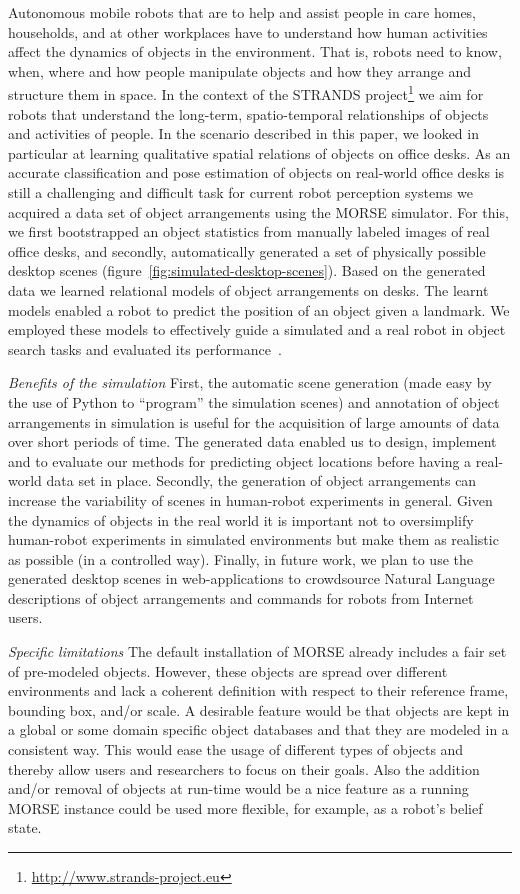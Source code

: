 \documentclass[letterpaper, 10pt, conference]{ieeeconf}
\begin{document}
Autonomous mobile robots that are to help and assist people in care homes,
households, and at other workplaces have to understand how human activities
affect the dynamics of objects in the environment. That is, robots need to know,
when, where and how people manipulate objects and how they arrange and structure
them in space. In the context of the STRANDS
project\footnote{\url{http://www.strands-project.eu}} we aim for robots that
understand the long-term, spatio-temporal relationships of objects and
activities of people. In the scenario described in this paper, we looked in
particular at learning qualitative spatial relations of objects on office desks.
As an accurate classification and pose estimation of objects on real-world
office desks is still a challenging and difficult task for current robot
perception systems we acquired a data set of object arrangements using the MORSE
simulator. For this, we first bootstrapped an object statistics from manually
labeled images of real office desks, and secondly, automatically generated a set
of physically possible desktop scenes
(figure~\ref{fig:simulated-desktop-scenes}). Based on the generated data we
learned relational models of object arrangements on desks. The learnt models
enabled a robot to predict the position of an object given a landmark. We
employed these models to effectively guide a simulated and a real robot in
object search tasks and evaluated its performance~\cite{kunze14indirect}.

\emph{Benefits of the simulation} First, the automatic scene generation (made
easy by the use of Python to ``program'' the simulation scenes) and annotation
of object arrangements in simulation is useful for the acquisition of large
amounts of data over short periods of time. The generated data enabled us to
design, implement and to evaluate our methods for predicting object locations
before having a real-world data set in place. Secondly, the generation of object
arrangements can increase the variability of scenes in human-robot experiments
in general. Given the dynamics of objects in the real world it is important not
to oversimplify human-robot experiments in simulated environments but make them
as realistic as possible (in a controlled way). Finally, in future work, we plan
to use the generated desktop scenes in web-applications to crowdsource Natural
Language descriptions of object arrangements and commands for robots from
Internet users.

\emph{Specific limitations} The default installation of MORSE already includes a
fair set of pre-modeled objects. However, these objects are spread over
different environments and lack a coherent definition with respect to their
reference frame, bounding box, and/or scale. A desirable feature would be that
objects are kept in a global or some domain specific object databases and that
they are modeled in a consistent way. This would ease the usage of different
types of objects and thereby allow users and researchers to focus on their
goals. Also the addition and/or removal of objects at run-time would be a nice
feature as a running MORSE instance could be used more flexible, for example,
as a robot's belief state.
\end{document}
